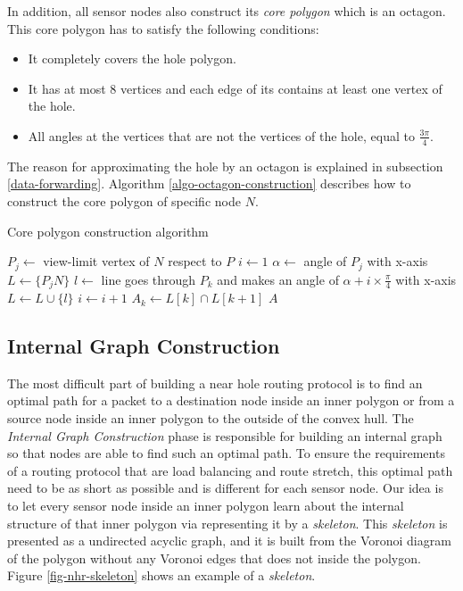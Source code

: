 In addition, all sensor nodes also construct its \emph{core polygon} which is an octagon. This core polygon has to satisfy the following conditions:
\begin{itemize}
\item It completely covers the hole polygon.
\item It has at most 8 vertices and each edge of its contains at least one vertex of the hole.
\item All angles at the vertices that are not the vertices of the hole, equal to $\frac{3\pi}{4}$.
\end{itemize}
The reason for approximating the hole by an octagon is explained in subsection \ref{data-forwarding}. Algorithm \ref{algo-octagon-construction} describes how to construct the core polygon of specific node $N$.

\begin{algorithm}[!htb]
\SetAlgoLined
\caption{Core polygon construction algorithm}
\label{algo-octagon-construction}
$P_j\leftarrow$ view-limit vertex of $N$ respect to $P$\;
$i \leftarrow 1$\;
$\alpha \leftarrow$ angle of $P_j$ with x-axis\;
$L \leftarrow \{P_jN\}$\;
 {
	$l \leftarrow$ line goes through $P_k$ and makes an angle of $\alpha + i \times \frac{\pi}{4}$ with x-axis\;
	 {
		$L \leftarrow L \cup \{l\}$\;
		$i \leftarrow i + 1$\;
	}
	 {
		\KwBreak
	}
}
 {
	$A_k \leftarrow L[k] \cap L[k+1]$\;
}
\Return $A$\;
\end{algorithm}


\subsection{Internal Graph Construction}
The most difficult part of building a near hole routing protocol is to find an optimal path for a packet to a destination node inside an inner polygon or from a source node inside an inner polygon to the outside of the convex hull. The \emph{Internal Graph Construction} phase is responsible for building an internal graph so that nodes are able to find such an optimal path. To ensure the requirements of a routing protocol that are load balancing and route stretch, this optimal path need to be as short as possible and is different for each sensor node. Our idea is to let every sensor node inside an inner polygon learn about the internal structure of that inner polygon via representing it by a \emph{skeleton}. This \emph{skeleton} is presented as a undirected acyclic graph, and it is built from the Voronoi diagram of the polygon without any Voronoi edges that does not inside the polygon. Figure \ref{fig-nhr-skeleton} shows an example of a \emph{skeleton}. 

